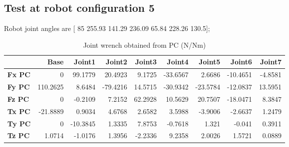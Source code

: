 
\subsection{Test at robot configuration 5}
Robot joint angles are  [ 85        255.93        141.29        236.09         65.84        228.26         130.5];

\begin{table}[h!]
	\centering
	\caption{Joint wrench obtained from PC (N/Nm)}
	\label{wrech_PC_Pose5}
	\begin{tabular}{|l|r|r|r|r|r|r|r|r|}
		\hline
		\textbf{}  & \textbf{Base} & \textbf{Joint1}  & \textbf{Joint2}  & \textbf{Joint3}  & \textbf{Joint4}  & \textbf{Joint5}  & \textbf{Joint6}  & \textbf{Joint7} \\ \hline
		\textbf{Fx PC}  & 0        & 99.1779        & 20.4923        & 9.1725        & -33.6567        & 2.6686        & -10.4651        & -4.8581 \\ \hline
		\textbf{Fy PC}  & 110.2625        & 8.6484        & -79.4216        & 14.5715        & -30.9342        & -23.5784        & -12.0837        & 13.5951 \\ \hline
		\textbf{Fz PC}  & 0        & -0.2109        & 7.2152        & 62.2928        & 10.5629        & 20.7507        & -18.0471        & 8.3847 \\ \hline
		\textbf{Tx PC}  & -21.8889        & 0.9034        & 4.6768        & 2.6582        & 3.5988        & -3.9006        & -2.6637        & 1.2479 \\ \hline
		\textbf{Ty PC}  & 0        & -10.3845        & 1.3335        & 7.8753        & -0.7618        & 1.321        & -0.041        & 0.3911 \\ \hline
		\textbf{Tz PC}  & 1.0714        & -1.0176        & 1.3956        & -2.2336        & 9.2358        & 2.0026        & 1.5721        & 0.0889 \\ \hline
	\end{tabular}
\end{table}

